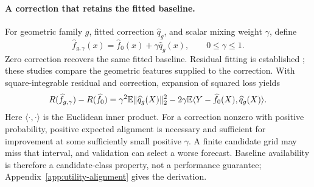 \paragraph{A correction that retains the fitted baseline.}
For geometric family $g$, fitted correction $\widehat q_g$, and scalar
mixing weight $\gamma$, define
\begin{equation}\label{eq:utility-additive}
 \widehat f_{g,\gamma}(x)
 =\widehat f_0(x)+\gamma\widehat q_g(x),\qquad 0\leq\gamma\leq1.
\end{equation}
Zero correction recovers the same fitted baseline. Residual fitting is
established \citep{Buhlmann2003L2}; these studies compare the geometric
features supplied to the correction. With square-integrable residual
and correction, expansion of squared loss yields
\begin{equation}\label{eq:utility-alignment}
 R(\widehat f_{g,\gamma})-R(\widehat f_0)
 =\gamma^2\mathbb{E}\|\widehat q_g(X)\|_2^2
 -2\gamma\mathbb{E}\langle Y-\widehat f_0(X),\widehat q_g(X)\rangle.
\end{equation}
Here $\langle\cdot,\cdot\rangle$ is the Euclidean inner product.
For a correction nonzero with positive probability, positive expected
alignment is necessary and sufficient for improvement at some
sufficiently small positive $\gamma$. A finite candidate grid may miss
that interval, and validation can select a worse forecast. Baseline
availability is therefore a candidate-class property, not a performance
guarantee; Appendix~\ref{app:utility-alignment} gives the derivation.
